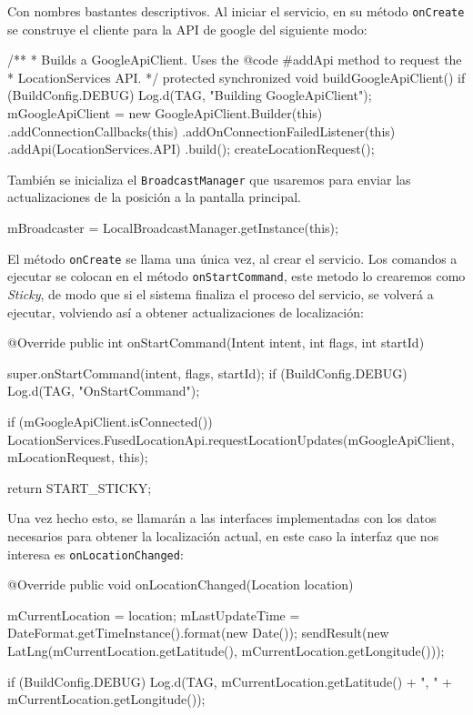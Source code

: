 \documentclass[	DIV=calc,%
							paper=a4,%
							fontsize=11pt]{scrartcl}	 					%
\begin{document}
Con nombres bastantes descriptivos. Al iniciar el servicio, en su método
\texttt{onCreate} se construye el cliente para la API de google del
siguiente modo:

\begin{javacode}
	/**
	 * Builds a GoogleApiClient. Uses the {@code #addApi} method to request the
	 * LocationServices API.
	 */
	protected synchronized void buildGoogleApiClient() {
			if (BuildConfig.DEBUG) {
					Log.d(TAG, "Building GoogleApiClient");
			}
			mGoogleApiClient = new GoogleApiClient.Builder(this)
							.addConnectionCallbacks(this)
							.addOnConnectionFailedListener(this)
							.addApi(LocationServices.API)
							.build();
			createLocationRequest();
	}
\end{javacode}

También se inicializa el \texttt{BroadcastManager} que usaremos para
enviar las actualizaciones de la posición a la pantalla principal.

\begin{javacode}
mBroadcaster = LocalBroadcastManager.getInstance(this);
\end{javacode}

El método \texttt{onCreate} se llama una única vez, al crear el
servicio. Los comandos a ejecutar se colocan en el método
\texttt{onStartCommand}, este metodo lo crearemos como \emph{Sticky}, de
modo que si el sistema finaliza el proceso del servicio, se volverá a
ejecutar, volviendo así a obtener actualizaciones de localización:

\begin{javacode}
	@Override
	public int onStartCommand(Intent intent, int flags, int startId) {
			super.onStartCommand(intent, flags, startId);
			if (BuildConfig.DEBUG) {
					Log.d(TAG, "OnStartCommand");
			}

			if (mGoogleApiClient.isConnected()) {
				LocationServices.FusedLocationApi.requestLocationUpdates(mGoogleApiClient,
								mLocationRequest, this);
			}

			return START_STICKY;
	}
\end{javacode}

Una vez hecho esto, se llamarán a las interfaces implementadas con los
datos necesarios para obtener la localización actual, en este caso la
interfaz que nos interesa es \texttt{onLocationChanged}:

\begin{javacode}
	@Override
	public void onLocationChanged(Location location) {
			mCurrentLocation = location;
			mLastUpdateTime = DateFormat.getTimeInstance().format(new Date());
			sendResult(new LatLng(mCurrentLocation.getLatitude(), mCurrentLocation.getLongitude()));

			if (BuildConfig.DEBUG) {
					Log.d(TAG, mCurrentLocation.getLatitude() + ", " + mCurrentLocation.getLongitude());
			}
	}
\end{javacode}
\end{document}
